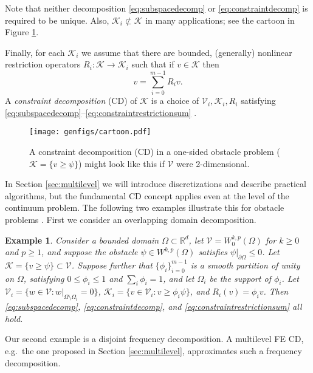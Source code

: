 \documentclass[letterpaper,final,12pt,reqno]{amsart}
\theoremstyle{cstyle}
\theoremstyle{cstyle*}
\theoremstyle{dstyle}
\newtheorem{example}[theorem]{Example}
\numberwithin{equation}{section}
\numberwithin{figure}{section}
\numberwithin{table}{section}
\numberwithin{theorem}{section}
\newcommand{\RR}{\mathbb{R}}
\newcommand{\cK}{\mathcal{K}}
\newcommand{\cV}{\mathcal{V}}
\begin{document}
Note that neither decomposition \eqref{eq:subspacedecomp} or \eqref{eq:constraintdecomp} is required to be unique.  Also, $\cK_i \not\subset \cK$ in many applications; see the cartoon in Figure \ref{fig:cartoon}.

Finally, for each $\cK_i$ we assume that there are bounded, (generally) nonlinear restriction operators $R_i : \cK \to \cK_i$ such that if $v \in \cK$ then
\begin{equation}
v = \sum_{i=0}^{m-1} R_i v.  \label{eq:constraintrestrictionsum}
\end{equation}
A \emph{constraint decomposition} (CD) of $\cK$ is a choice of $\cV_i,\cK_i,R_i$ satisfying \eqref{eq:subspacedecomp}--\eqref{eq:constraintrestrictionsum} \cite{Tai2003}.

\begin{figure}[ht]
\texttt{[image: genfigs/cartoon.pdf]}
\caption{A constraint decomposition (CD) in a one-sided obstacle problem ($\mathcal{K}=\{v\ge \psi\}$) might look like this if $\mathcal{V}$ were 2-dimensional.}
\label{fig:cartoon}
\end{figure}

In Section \ref{sec:multilevel} we will introduce discretizations and describe practical algorithms, but the fundamental CD concept applies even at the level of the continuum problem.  The following two examples illustrate this for obstacle problems \cite{GraeserKornhuber2009}.  First we consider an overlapping domain decomposition.

\begin{example}  \label{ex:domaindecomposition}  Consider a bounded domain $\Omega \subset \RR^d$, let $\cV = W_0^{k,p}(\Omega)$ for $k\ge 0$ and $p\ge 1$, and suppose the obstacle $\psi \in W^{k,p}(\Omega)$ satisfies $\psi|_{\partial \Omega} \le 0$.  Let $\cK = \{v \ge \psi\} \subset \cV$.  Suppose further that $\{\phi_i\}_{i=0}^{m-1}$ is a smooth partition of unity on $\Omega$, satisfying $0 \le \phi_i\le 1$ and $\sum_i \phi_i = 1$, and let $\Omega_i$ be the support of $\phi_i$.  Let $\cV_i = \{w \in \cV:w|_{\Omega \setminus \Omega_i} =0 \}$, $\cK_i = \{v \in \cV_i: v \ge \phi_i \psi\}$, and $R_i(v) = \phi_i v$.  Then \eqref{eq:subspacedecomp}, \eqref{eq:constraintdecomp}, and \eqref{eq:constraintrestrictionsum} all hold.
\end{example}

Our second example is a disjoint frequency decomposition.  A multilevel FE CD, e.g.~the one proposed in Section \ref{sec:multilevel}, approximates such a frequency decomposition.
\end{document}

